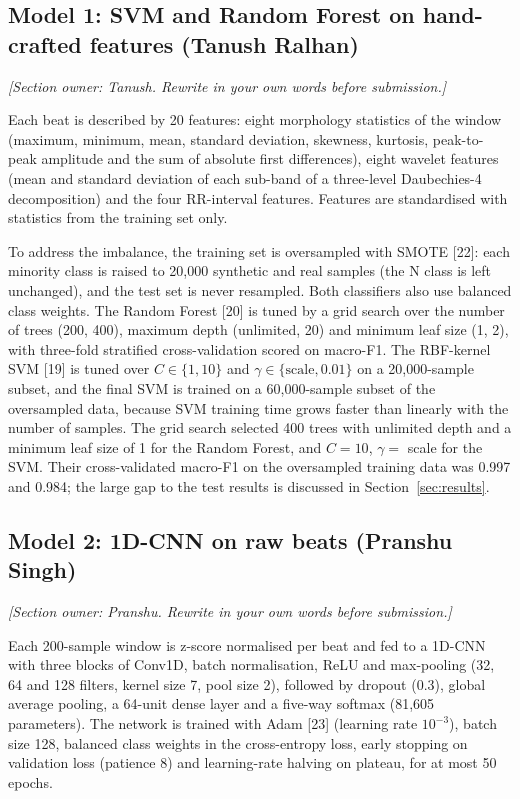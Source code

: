 \documentclass[11pt,a4paper]{article}
\begin{document}
\subsection{Model 1: SVM and Random Forest on hand-crafted features (Tanush Ralhan)}
\textit{[Section owner: Tanush. Rewrite in your own words before submission.]}

Each beat is described by 20 features: eight morphology statistics of the window (maximum, minimum, mean, standard deviation, skewness, kurtosis, peak-to-peak amplitude and the sum of absolute first differences), eight wavelet features (mean and standard deviation of each sub-band of a three-level Daubechies-4 decomposition) and the four RR-interval features. Features are standardised with statistics from the training set only.

To address the imbalance, the training set is oversampled with SMOTE [22]: each minority class is raised to 20,000 synthetic and real samples (the N class is left unchanged), and the test set is never resampled. Both classifiers also use balanced class weights. The Random Forest [20] is tuned by a grid search over the number of trees (200, 400), maximum depth (unlimited, 20) and minimum leaf size (1, 2), with three-fold stratified cross-validation scored on macro-F1. The RBF-kernel SVM [19] is tuned over $C \in \{1, 10\}$ and $\gamma \in \{\text{scale}, 0.01\}$ on a 20,000-sample subset, and the final SVM is trained on a 60,000-sample subset of the oversampled data, because SVM training time grows faster than linearly with the number of samples. The grid search selected 400 trees with unlimited depth and a minimum leaf size of 1 for the Random Forest, and $C = 10$, $\gamma = $ scale for the SVM. Their cross-validated macro-F1 on the oversampled training data was 0.997 and 0.984; the large gap to the test results is discussed in Section~\ref{sec:results}.

\subsection{Model 2: 1D-CNN on raw beats (Pranshu Singh)}
\textit{[Section owner: Pranshu. Rewrite in your own words before submission.]}

Each 200-sample window is z-score normalised per beat and fed to a 1D-CNN with three blocks of Conv1D, batch normalisation, ReLU and max-pooling (32, 64 and 128 filters, kernel size 7, pool size 2), followed by dropout (0.3), global average pooling, a 64-unit dense layer and a five-way softmax (81,605 parameters). The network is trained with Adam [23] (learning rate $10^{-3}$), batch size 128, balanced class weights in the cross-entropy loss, early stopping on validation loss (patience 8) and learning-rate halving on plateau, for at most 50 epochs.
\end{document}
